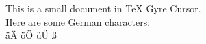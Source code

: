 \documentclass{article}
\begin{document}
This is a small document in TeX Gyre Cursor.
\\
Here are some German characters:
\\
äÄ öÖ üÜ ß
\end{document}
